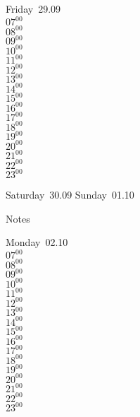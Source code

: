 \documentclass[11pt, a4paper]{book}\usepackage[]{graphicx}\usepackage[]{color}
\begin{document}
\begin{weekdaybox}
  Friday~29.09\\
  { 
  \vfill
  $07^{00}$\\
$08^{00}$\\
$09^{00}$\\
$10^{00}$\\
$11^{00}$\\
$12^{00}$\\
$13^{00}$\\
$14^{00}$\\
$15^{00}$\\
$16^{00}$\\
$17^{00}$\\
$18^{00}$\\
$19^{00}$\\
$20^{00}$\\
$21^{00}$\\
$22^{00}$\\
$23^{00}$\\
  }
\end{weekdaybox}
\begin{weekendbox}
  Saturday~30.09
  \tcblower
  Sunday~01.10
\end{weekendbox} %
\begin{notebox}
  Notes
\end{notebox}
\clearpage
\begin{headerbox}
\end{headerbox}
\begin{weekdaybox}
  Monday~02.10\\
  { 
  \vfill
  $07^{00}$\\
$08^{00}$\\
$09^{00}$\\
$10^{00}$\\
$11^{00}$\\
$12^{00}$\\
$13^{00}$\\
$14^{00}$\\
$15^{00}$\\
$16^{00}$\\
$17^{00}$\\
$18^{00}$\\
$19^{00}$\\
$20^{00}$\\
$21^{00}$\\
$22^{00}$\\
$23^{00}$\\
  }
\end{weekdaybox}
\end{document}

